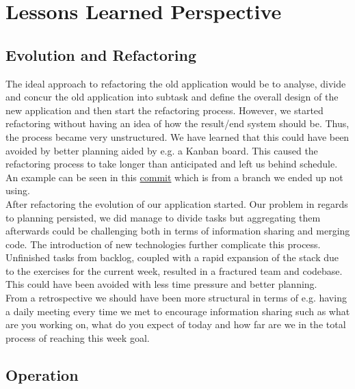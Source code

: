 \section{Lessons Learned Perspective}

\subsection{Evolution and Refactoring}
The ideal approach to refactoring the old application would be to analyse, divide and concur the old application into 
subtask and define the overall design of the new application and then start the refactoring process. However, we started
refactoring without having an idea of how the result/end system should be. Thus, the process became very unstructured. 
We have learned that this could have been avoided by better planning aided by e.g. a Kanban board. This caused the 
refactoring process to take longer than anticipated and left us behind schedule. An example can be seen in this
\href{https://github.com/organizationGB/DevOps/commit/7bbccc97d6d69e90724b00e93e92334210490085}{commit} which is from a 
branch we ended up not using. \\

After refactoring the evolution of our application started. Our problem in regards to planning persisted, we did manage
to divide tasks but aggregating them afterwards could be challenging both in terms of information sharing and merging 
code. The introduction of new technologies further complicate this process. Unfinished tasks from backlog, coupled
with a rapid expansion of the stack due to the exercises for the current week, resulted in a fractured team and
codebase. This could have been avoided with less time pressure and better planning.\\

From a retrospective we should have been more structural in terms of e.g. having a daily meeting every time we met to encourage 
information sharing such as what are you working on, what do you expect of today and how far are we in the total process
of reaching this week goal.

\subsection{Operation}

